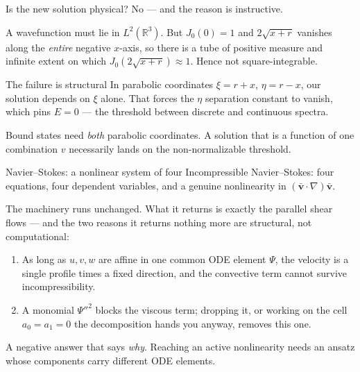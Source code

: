 \documentclass[10pt,aspectratio=169]{beamer}
\begin{document}
\begin{frame}{Is the new solution physical?}
No --- and the reason is instructive.

\pause
\medskip
A wavefunction must lie in $L^{2}(\mathbb{R}^{3})$. But $J_{0}(0) = 1$ and
$2\sqrt{x+r}$ vanishes along the \emph{entire} negative $x$-axis, so there is a
tube of positive measure and infinite extent on which
$J_{0}(2\sqrt{x+r}) \approx 1$. Hence not square-integrable.

\pause
\medskip
\begin{block}{The failure is structural}
In parabolic coordinates $\xi = r+x$, $\eta = r-x$, our solution depends on $\xi$
alone. That forces the $\eta$ separation constant to vanish, which pins
$E = 0$ --- the threshold between discrete and continuous spectra.
\end{block}

\pause
\medskip
Bound states need \emph{both} parabolic coordinates. A solution that is a function
of one combination $v$ necessarily lands on the non-normalizable threshold.
\end{frame}

\begin{frame}{Navier--Stokes: a nonlinear system of four}
Incompressible Navier--Stokes: four equations, four dependent variables, and a
genuine nonlinearity in $(\bar{\mathbf{v}}\cdot\nabla)\bar{\mathbf{v}}$.

\pause
\medskip
The machinery runs \alert{unchanged}. What it returns is exactly the
\alert{parallel shear flows} --- and the two reasons it returns nothing more are
structural, not computational:

\pause
\begin{enumerate}
  \item As long as $u,v,w$ are affine in one common ODE element $\Psi$, the
        velocity is a single profile times a fixed direction, and the convective
        term cannot survive incompressibility.
  \item A monomial $\Psi''^{2}$ blocks the viscous term; dropping it, or working
        on the cell $a_{0}=a_{1}=0$ the decomposition hands you anyway, removes
        this one.
\end{enumerate}

\pause
\medskip
\begin{alertblock}{}
A negative answer that says \emph{why}. Reaching an active nonlinearity needs an
ansatz whose components carry \alert{different} ODE elements.
\end{alertblock}
\end{frame}
\end{document}
